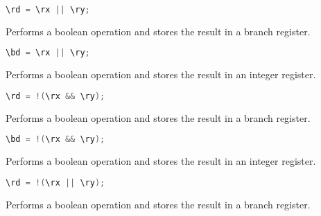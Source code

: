 \begin{lstlisting}[numbers=none, basicstyle=\ttfamily\footnotesize, language=C++]
\rd = \rx || \ry;
\end{lstlisting}

Performs a boolean  operation and stores the result in a branch
register.

\begin{lstlisting}[numbers=none, basicstyle=\ttfamily\footnotesize, language=C++]
\bd = \rx || \ry;
\end{lstlisting}

Performs a boolean  operation and stores the result in an integer
register.

\begin{lstlisting}[numbers=none, basicstyle=\ttfamily\footnotesize, language=C++]
\rd = !(\rx && \ry);
\end{lstlisting}

Performs a boolean  operation and stores the result in a branch
register.

\begin{lstlisting}[numbers=none, basicstyle=\ttfamily\footnotesize, language=C++]
\bd = !(\rx && \ry);
\end{lstlisting}

Performs a boolean  operation and stores the result in an integer
register.

\begin{lstlisting}[numbers=none, basicstyle=\ttfamily\footnotesize, language=C++]
\rd = !(\rx || \ry);
\end{lstlisting}

Performs a boolean  operation and stores the result in a branch
register.

